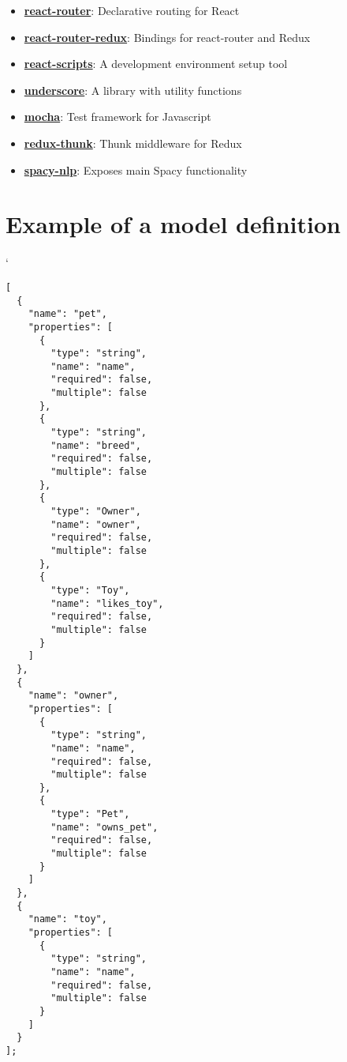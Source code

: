 \begin{itemize}
  \item \href{https://github.com/ReactTraining/react-router}{\textbf{react-router}}: Declarative routing for React
  \item \href{https://github.com/reactjs/react-router-redux}{\textbf{react-router-redux}}: Bindings for react-router and Redux
  \item \href{https://github.com/facebookincubator/create-react-app}{\textbf{react-scripts}}: A development environment setup tool
\item \href{http://underscorejs.org/}{\textbf{underscore}}: A library with utility functions
\item \href{https://mochajs.org/}{\textbf{mocha}}: Test framework for Javascript
  \item \href{https://github.com/gaearon/redux-thunk}{\textbf{redux-thunk}}: Thunk middleware for Redux
  \item \href{https://github.com/kengz/spacy-nlp/blob/master/src/py/nlp.py}{\textbf{spacy-nlp}}: Exposes main Spacy functionality
\end{itemize}


\section{Example of a model definition}
\label{modeldef}

`\begin{lstlisting}
[
  {
    "name": "pet",
    "properties": [
      {
        "type": "string",
        "name": "name",
        "required": false,
        "multiple": false
      },
      {
        "type": "string",
        "name": "breed",
        "required": false,
        "multiple": false
      },
      {
        "type": "Owner",
        "name": "owner",
        "required": false,
        "multiple": false
      },
      {
        "type": "Toy",
        "name": "likes_toy",
        "required": false,
        "multiple": false
      }
    ]
  },
  {
    "name": "owner",
    "properties": [
      {
        "type": "string",
        "name": "name",
        "required": false,
        "multiple": false
      },
      {
        "type": "Pet",
        "name": "owns_pet",
        "required": false,
        "multiple": false
      }
    ]
  },
  {
    "name": "toy",
    "properties": [
      {
        "type": "string",
        "name": "name",
        "required": false,
        "multiple": false
      }
    ]
  }
];

\end{lstlisting}
